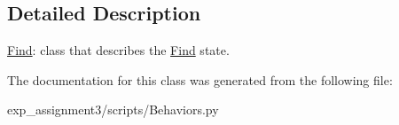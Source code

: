 \subsection{Detailed Description}
\hyperlink{classBehaviors_1_1Find}{Find}\+: class that describes the \hyperlink{classBehaviors_1_1Find}{Find} state. 

The documentation for this class was generated from the following file\+:\begin{DoxyCompactItemize}
\item 
exp\+\_\+assignment3/scripts/Behaviors.\+py\end{DoxyCompactItemize}
